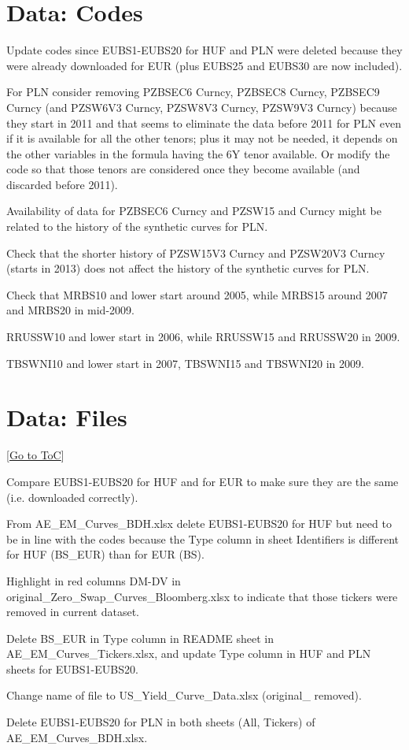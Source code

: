 \documentclass[12pt]{article}
\newcommand{\gototoc}{\vspace{-1.8cm} \null\hfill [\hyperlink{toc}{Go to ToC}] \newline}
\newcommand{\cmark}{\ding{51}}
\newcommand{\done}{\rlap{$\square$}{\raisebox{2pt}{\large\hspace{1pt}\cmark}}%
	\hspace{-2.5pt}}
\begin{document}
\section{Data: Codes}
\begin{todolist}
	\item Update codes since EUBS1-EUBS20 for HUF and PLN were deleted because they were already downloaded for EUR (plus EUBS25 and EUBS30 are now included).
	\item For PLN consider removing PZBSEC6 Curncy, PZBSEC8 Curncy, PZBSEC9 Curncy (and PZSW6V3 Curncy, PZSW8V3 Curncy, PZSW9V3 Curncy) because they start in 2011 and that seems to eliminate the data before 2011 for PLN even if it is available for all the other tenors; plus it may not be needed, it depends on the other variables in the formula having the 6Y tenor available. Or modify the code so that those tenors are considered once they become available (and discarded before 2011).
	\item Availability of data for PZBSEC6 Curncy and PZSW15 and Curncy might be related to the history of the synthetic curves for PLN.
	\item Check that the shorter history of PZSW15V3 Curncy and PZSW20V3 Curncy (starts in 2013) does not affect the history of the synthetic curves for PLN.
	\item Check that MRBS10 and lower start around 2005, while MRBS15 around 2007 and MRBS20 in mid-2009.
	\item RRUSSW10 and lower start in 2006, while RRUSSW15 and RRUSSW20 in 2009.
	\item TBSWNI10  and lower start in 2007, TBSWNI15 and TBSWNI20 in 2009.
\end{todolist}

\section{Data: Files}
\gototoc
\begin{todolist}
	\item Compare EUBS1-EUBS20 for HUF and for EUR to make sure they are the same (i.e. downloaded correctly).
	\item From AE_EM_Curves_BDH.xlsx delete EUBS1-EUBS20 for HUF but need to be in line with the codes because the Type column in sheet Identifiers is different for HUF (BS_EUR) than for EUR (BS). 
	\begin{todolist}
		\item Highlight in red columns DM-DV in original_Zero_Swap_Curves_Bloomberg.xlsx to indicate that those tickers were removed in current dataset.
		\item Delete BS_EUR in Type column in README sheet in AE_EM_Curves_Tickers.xlsx, and update Type column in HUF and PLN sheets for EUBS1-EUBS20.
	\end{todolist}
	\item[\done] Change name of file to US_Yield_Curve_Data.xlsx (original_ removed).
	\item[\done] Delete EUBS1-EUBS20 for PLN in both sheets (All, Tickers) of AE_EM_Curves_BDH.xlsx.
\end{todolist}
\end{document}
